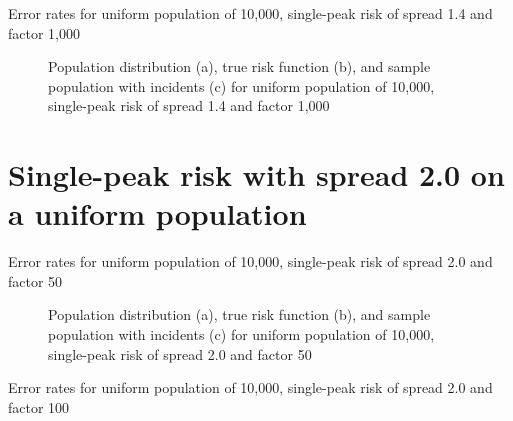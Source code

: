 
\begin{table}[H]

\caption[]{Error rates for uniform population of 10,000, single-peak risk of \gls{spread} 1.4 and \gls{factor} 1,000}
\label{tab:mean_error_rates:unif_1000_1.4_1h}
\end{table}

\begin{figure}[H]
    
    \caption[]{Population distribution (a), true risk function (b), and sample population with incidents (c) for uniform population of 10,000, single-peak risk of \gls{spread} 1.4 and \gls{factor} 1,000}
    \label{fig:distributions:unif_1000_1.4_1h}    
\end{figure}

 
 
\section{Single-peak risk with spread 2.0 on a uniform population}
\label{sec:app:results_unif_2.0_1h}


\begin{table}[H]
    
    \caption[]{Error rates for uniform population of 10,000, single-peak risk of \gls{spread} 2.0 and \gls{factor} 50}
    \label{tab:mean_error_rates:unif_50_2.0_1h}
\end{table}

\begin{figure}[H]
    
    \caption[]{Population distribution (a), true risk function (b), and sample population with incidents (c) for uniform population of 10,000, single-peak risk of \gls{spread} 2.0 and \gls{factor} 50}
    \label{fig:distributions:unif_50_2.0_1h}    
\end{figure}



\begin{table}[H]

\caption[]{Error rates for uniform population of 10,000, single-peak risk of \gls{spread} 2.0 and \gls{factor} 100}
\label{tab:mean_error_rates:unif_100_2.0_1h}
\end{table}


